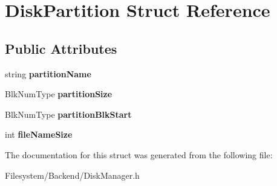 \hypertarget{structDiskPartition}{}\section{Disk\+Partition Struct Reference}
\label{structDiskPartition}
\subsection*{Public Attributes}
\begin{DoxyCompactItemize}
\item 
\mbox{\label{structDiskPartition_a8c89b5f115fa534a3cb5d76505de97cb}} 
string {\bfseries partition\+Name}
\item 
\mbox{\label{structDiskPartition_a61dfe31b8baf361738168c2521c19286}} 
Blk\+Num\+Type {\bfseries partition\+Size}
\item 
\mbox{\label{structDiskPartition_a2b5b89e7739ffa6ac21772a92f88e35f}} 
Blk\+Num\+Type {\bfseries partition\+Blk\+Start}
\item 
\mbox{\label{structDiskPartition_a6fd44394d9d8bf83fa61cfd12be25412}} 
int {\bfseries file\+Name\+Size}
\end{DoxyCompactItemize}


The documentation for this struct was generated from the following file\+:\begin{DoxyCompactItemize}
\item 
Filesystem/\+Backend/Disk\+Manager.\+h\end{DoxyCompactItemize}
